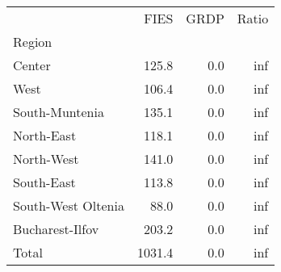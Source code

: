 \begin{tabular}{lrrr}
\toprule
{} &    FIES &  GRDP &  Ratio \\
Region             &         &       &        \\
\midrule
Center             &   125.8 &   0.0 &    inf \\
West               &   106.4 &   0.0 &    inf \\
South-Muntenia     &   135.1 &   0.0 &    inf \\
North-East         &   118.1 &   0.0 &    inf \\
North-West         &   141.0 &   0.0 &    inf \\
South-East         &   113.8 &   0.0 &    inf \\
South-West Oltenia &    88.0 &   0.0 &    inf \\
Bucharest-Ilfov    &   203.2 &   0.0 &    inf \\
Total              &  1031.4 &   0.0 &    inf \\
\bottomrule
\end{tabular}
